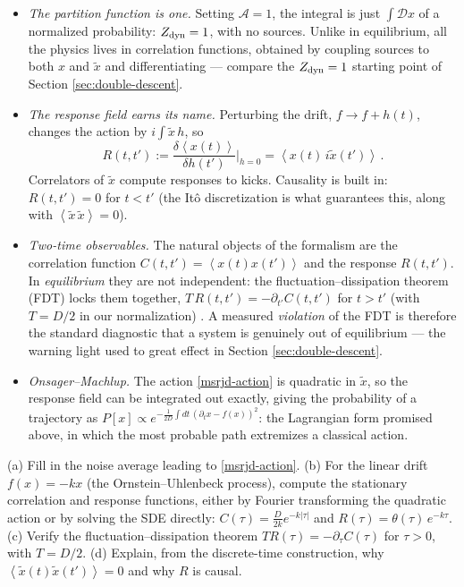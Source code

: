 \documentclass[11pt]{article}
\newcommand{\pd}{\partial}
\newcommand{\expval}[1]{\left\langle #1 \right\rangle}
\begin{document}
\begin{itemize}
    \item \emph{The partition function is one.} Setting $\mathcal{A}=1$, the integral is just $\int \mathcal Dx$ of a normalized probability: $Z_{\rm dyn}=1$, with no sources. Unlike in equilibrium, all the physics lives in correlation functions, obtained by coupling sources to both $x$ and $\tilde x$ and differentiating --- compare the $Z_{\rm dyn}=1$ starting point of Section \ref{sec:double-descent}.
    \item \emph{The response field earns its name.} Perturbing the drift, $f \to f + h(t)$, changes the action by $i\int \tilde x\, h$, so
    \begin{equation} \label{response-def}
        R(t,t') := \frac{\delta \expval{x(t)}}{\delta h(t')}\bigg|_{h=0} = \expval{x(t)\, i \tilde x(t')}\,.
    \end{equation}
    Correlators of $\tilde x$ compute responses to kicks. Causality is built in: $R(t,t')=0$ for $t<t'$ (the It\^o discretization is what guarantees this, along with $\expval{\tilde x\, \tilde x} = 0$).
    \item \emph{Two-time observables.} The natural objects of the formalism are the correlation function $C(t,t') = \expval{x(t)x(t')}$ and the response $R(t,t')$. In \emph{equilibrium} they are not independent: the fluctuation--dissipation theorem (FDT) locks them together, $T\, R(t,t') = -\pd_{t'} C(t,t')$ for $t>t'$ (with $T = D/2$ in our normalization) \cite{kuboStatisticalMechanicalTheoryIrreversible1957,kuboFluctuationdissipationTheorem1966}. A measured \emph{violation} of the FDT is therefore the standard diagnostic that a system is genuinely out of equilibrium --- the warning light used to great effect in Section \ref{sec:double-descent}.
    \item \emph{Onsager--Machlup.} The action \eqref{msrjd-action} is quadratic in $\tilde x$, so the response field can be integrated out exactly, giving the probability of a trajectory as $P[x] \propto e^{-\frac{1}{2D}\int dt\, (\partial_t x - f(x))^2}$: the Lagrangian form promised above, in which the most probable path extremizes a classical action.
\end{itemize}

\begin{exercise}
\label{ex:msrjd}
(a) Fill in the noise average leading to \eqref{msrjd-action}.
(b) For the linear drift $f(x) = -k x$ (the Ornstein--Uhlenbeck process), compute the stationary correlation and response functions, either by Fourier transforming the quadratic action or by solving the SDE directly:
$C(\tau) = \frac{D}{2k} e^{-k|\tau|}$ and $R(\tau) = \theta(\tau)\, e^{-k\tau}$.
(c) Verify the fluctuation--dissipation theorem $T R(\tau) = -\pd_\tau C(\tau)$ for $\tau>0$, with $T = D/2$.
(d) Explain, from the discrete-time construction, why $\expval{\tilde x(t) \tilde x(t')} = 0$ and why $R$ is causal.
\end{exercise}
\end{document}
